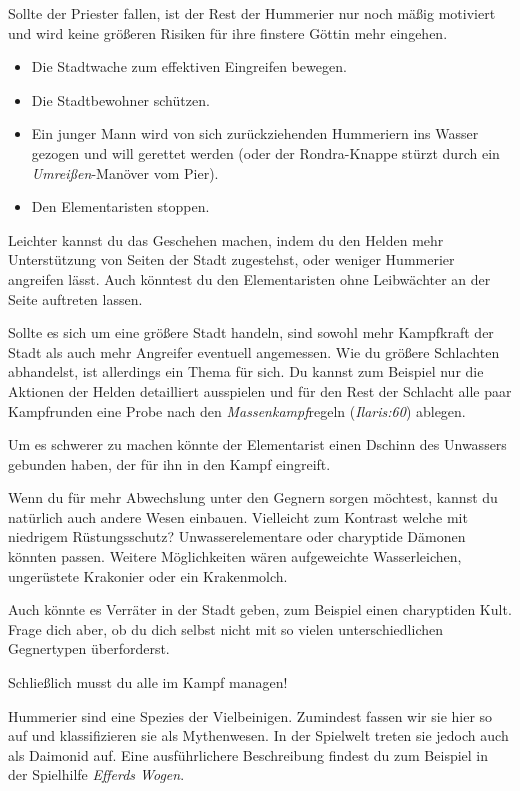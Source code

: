 Sollte der Priester fallen, ist der Rest der Hummerier nur noch mäßig motiviert und wird keine größeren Risiken für ihre finstere Göttin mehr eingehen.

\begin{itemize}
\item Die Stadtwache zum effektiven Eingreifen bewegen.
\item Die Stadtbewohner schützen.
\item Ein junger Mann wird von sich zurückziehenden Hummeriern ins Wasser gezogen und will gerettet werden (oder der Rondra-Knappe stürzt durch ein \textit{Umreißen}-Manöver vom Pier).
\item Den Elementaristen stoppen.
\end{itemize}

Leichter kannst du das Geschehen machen, indem du den Helden mehr Unterstützung von Seiten der Stadt zugestehst, oder weniger Hummerier angreifen lässt.
Auch könntest du den Elementaristen ohne Leibwächter an der Seite auftreten lassen. 

Sollte es sich um eine größere Stadt handeln, sind sowohl mehr Kampfkraft der Stadt als auch mehr Angreifer eventuell angemessen.
Wie du größere Schlachten abhandelst, ist allerdings ein Thema für sich.
Du kannst zum Beispiel nur die Aktionen der Helden detailliert ausspielen und für den Rest der Schlacht alle paar Kampfrunden eine Probe nach den \textit{Massenkampf}regeln (\textit{Ilaris:60}) ablegen. 


Um es schwerer zu machen könnte der Elementarist einen Dschinn des Unwassers gebunden haben, der für ihn in den Kampf eingreift. 

Wenn du für mehr Abwechslung unter den Gegnern sorgen möchtest, kannst du natürlich auch andere Wesen einbauen. Vielleicht zum Kontrast welche mit niedrigem Rüstungsschutz? Unwasserelementare oder charyptide Dämonen könnten passen. Weitere Möglichkeiten wären aufgeweichte Wasserleichen, ungerüstete Krakonier oder ein Krakenmolch.

Auch könnte es Verräter in der Stadt geben, zum Beispiel einen charyptiden Kult. Frage dich aber, ob du dich selbst nicht mit so vielen unterschiedlichen Gegnertypen überforderst.

Schließlich musst du alle im Kampf managen!

\newpage

Hummerier sind eine Spezies der Vielbeinigen. Zumindest fassen wir sie hier so auf und klassifizieren sie als Mythenwesen. In der Spielwelt treten sie jedoch auch als Daimonid auf. Eine ausführlichere Beschreibung findest du zum Beispiel in der Spielhilfe \textit{Efferds Wogen}.

